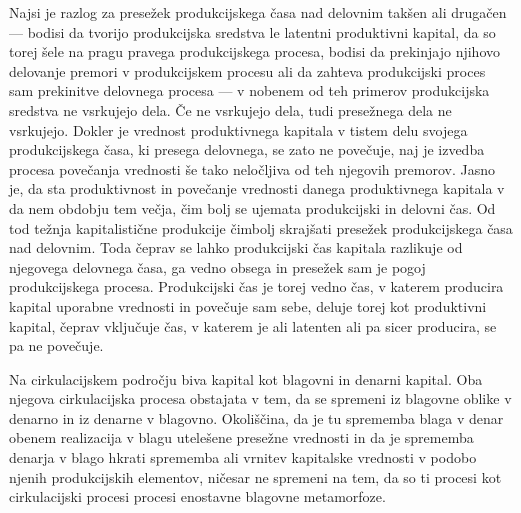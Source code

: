 \documentclass[kapital_02.tex]{subfiles}
\begin{document}
Najsi je razlog za presežek produkcijskega časa nad delovnim takšen ali drugačen — bodisi da tvorijo produkcijska sredstva le latentni produktivni kapital, da so torej šele na pragu pravega produkcijskega procesa, bodisi da prekinjajo njihovo delovanje premori v produkcijskem procesu ali da zahteva produkcijski proces sam prekinitve delovnega procesa — v nobenem od teh primerov produkcijska sredstva ne vsrkujejo dela.
Če ne vsrkujejo dela, tudi presežnega dela ne vsrkujejo.
Dokler je vrednost produktivnega kapitala v tistem delu svojega produkcijskega časa, ki presega delovnega, se zato ne povečuje, naj je izvedba procesa povečanja vrednosti še tako neločljiva od teh njegovih premorov.
Jasno je, da sta produktivnost in povečanje vrednosti danega produktivnega kapitala v da nem obdobju tem večja, čim bolj se ujemata produkcijski in delovni čas.
Od tod težnja kapitalistične produkcije čimbolj skrajšati presežek produkcijskega časa nad delovnim.
Toda čeprav se lahko produkcijski čas kapitala razlikuje od njegovega delovnega časa, ga vedno obsega in presežek sam je pogoj produkcijskega procesa.
Produkcijski čas je torej vedno čas, v katerem producira kapital uporabne vrednosti in povečuje sam sebe, deluje torej kot produktivni kapital, čeprav vključuje čas, v katerem je ali latenten ali pa sicer producira, se pa ne povečuje.

Na cirkulacijskem področju biva kapital kot blagovni in denarni kapital.
Oba njegova cirkulacijska procesa obstajata v tem, da se spremeni iz blagovne oblike v denarno in iz denarne v blagovno.
Okoliščina, da je tu sprememba blaga v denar obenem realizacija v blagu utelešene presežne vrednosti in da je sprememba denarja v blago hkrati sprememba ali vrnitev kapitalske vrednosti v podobo njenih produkcijskih elementov, ničesar ne spremeni na tem, da so ti procesi kot cirkulacijski procesi procesi enostavne blagovne metamorfoze.
\end{document}
